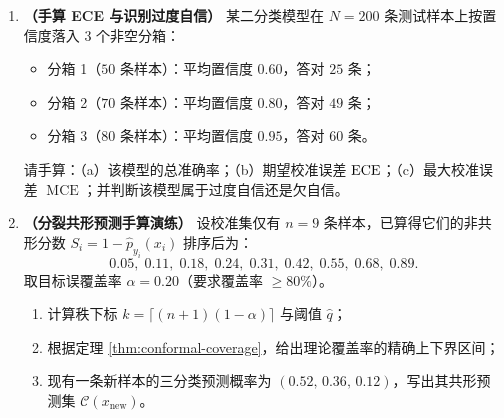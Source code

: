 \begin{enumerate}[label=\textbf{7.2.\arabic*}]
  \item \textbf{（手算 ECE 与识别过度自信）} 某二分类模型在 $N=200$ 条测试样本上按置信度落入 3 个非空分箱：
  \begin{itemize}
    \item 分箱 1（$50$ 条样本）：平均置信度 $0.60$，答对 $25$ 条；
    \item 分箱 2（$70$ 条样本）：平均置信度 $0.80$，答对 $49$ 条；
    \item 分箱 3（$80$ 条样本）：平均置信度 $0.95$，答对 $60$ 条。
  \end{itemize}
  请手算：（a）该模型的总准确率；（b）期望校准误差 $\operatorname{ECE}$；（c）最大校准误差 $\operatorname{MCE}$；并判断该模型属于过度自信还是欠自信。

  \item \textbf{（分裂共形预测手算演练）} 设校准集仅有 $n = 9$ 条样本，已算得它们的非共形分数 $S_i = 1 - \hat{p}_{y_i}(x_i)$ 排序后为：
  \[
    0.05,\; 0.11,\; 0.18,\; 0.24,\; 0.31,\; 0.42,\; 0.55,\; 0.68,\; 0.89.
  \]
  取目标误覆盖率 $\alpha = 0.20$（要求覆盖率 $\ge 80\%$）。
  \begin{enumerate}
    \item 计算秩下标 $k = \lceil(n+1)(1-\alpha)\rceil$ 与阈值 $\hat{q}$；
    \item 根据定理 \ref{thm:conformal-coverage}，给出理论覆盖率的精确上下界区间；
    \item 现有一条新样本的三分类预测概率为 $(0.52,\, 0.36,\, 0.12)$，写出其共形预测集 $\mathcal{C}(x_{\text{new}})$。
  \end{enumerate}
\end{enumerate}


